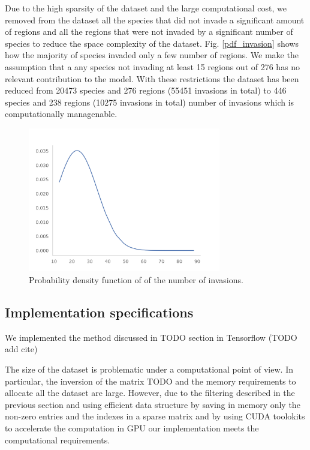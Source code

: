 \documentclass[mscthesis]{usiinfthesis}
\begin{document}
Due to the high sparsity of the dataset and the large computational cost, we removed from the dataset all the species that did not invade a significant amount of regions and all the regions that were not invaded by a significant number of species to reduce the space complexity of the dataset. Fig. \ref{pdf_invasion} shows how the majority of species invaded only a few number of regions. We make the assumption that a any species not invading at least 15 regions out of 276 has no relevant contribution to the model. With these restrictions the dataset has been reduced from 20473 species and 276 regions (55451 invasions in total) to 446 species and 238 regions (10275 invasions in total) number of invasions which is computationally managenable. 

\begin{figure}[H]
    \centering
    \includegraphics[width=0.75\textwidth]{species_region_invasion_filtering.png}
    \caption{Probability density function of of the number of invasions.}
    \label{fig:pdf_invasion}
\end{figure}


\subsection{Implementation specifications}
We implemented the method discussed in TODO section in Tensorflow (TODO add cite) 

The size of the dataset is problematic under a computational point of view. In particular, the inversion of the matrix TODO and the memory requirements to allocate all the dataset are large. However, due to the filtering described in the previous section and using efficient data structure by saving in memory only the non-zero entries and the indexes in a sparse matrix and by using CUDA toolokits to accelerate the computation in GPU our implementation meets the computational requirements.
 
\end{document}

